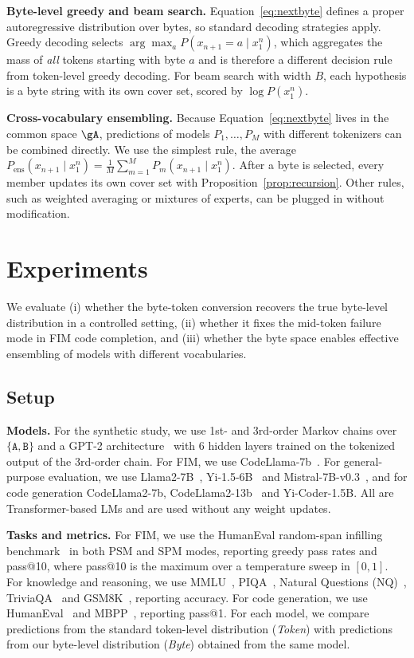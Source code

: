 \documentclass{article} %
\newcommand{\tok}[1]{\texttt{#1}}
\begin{document}
\textbf{Byte-level greedy and beam search.} Equation~\ref{eq:nextbyte} defines a proper autoregressive distribution over bytes, so standard decoding strategies apply. Greedy decoding selects $\arg\max_a P(x_{n+1}{=}a\mid x_1^n)$, which aggregates the mass of \emph{all} tokens starting with byte $a$ and is therefore a different decision rule from token-level greedy decoding. For beam search with width $B$, each hypothesis is a byte string with its own cover set, scored by $\log P(x_1^n)$.

\textbf{Cross-vocabulary ensembling.} Because Equation~\ref{eq:nextbyte} lives in the common space $\gA$, predictions of models $P_1,\dots,P_M$ with different tokenizers can be combined directly. We use the simplest rule, the average $P_{\text{ens}}(x_{n+1}\mid x_1^n)=\frac{1}{M}\sum_{m=1}^M P_m(x_{n+1}\mid x_1^n)$. After a byte is selected, every member updates its own cover set with Proposition~\ref{prop:recursion}. Other rules, such as weighted averaging or mixtures of experts, can be plugged in without modification.

\section{Experiments}
\label{sec:experiments}
We evaluate (i) whether the byte-token conversion recovers the true byte-level distribution in a controlled setting, (ii) whether it fixes the mid-token failure mode in FIM code completion, and (iii) whether the byte space enables effective ensembling of models with different vocabularies.

\subsection{Setup}
\label{sec:exp_setup}
\textbf{Models.} For the synthetic study, we use 1st- and 3rd-order Markov chains over $\{\tok{A},\tok{B}\}$ and a GPT-2 architecture~\citep{radford2019gpt2} with 6 hidden layers trained on the tokenized output of the 3rd-order chain. For FIM, we use CodeLlama-7b~\citep{roziere2023codellama}. For general-purpose evaluation, we use Llama2-7B~\citep{touvron2023llama2}, Yi-1.5-6B~\citep{young2024yi} and Mistral-7B-v0.3~\citep{jiang2023mistral}, and for code generation CodeLlama2-7b, CodeLlama2-13b~\citep{roziere2023codellama} and Yi-Coder-1.5B. All are Transformer-based LMs and are used without any weight updates.

\textbf{Tasks and metrics.} For FIM, we use the HumanEval random-span infilling benchmark~\citep{bavarian2022fim} in both PSM and SPM modes, reporting greedy pass rates and pass@10, where pass@10 is the maximum over a temperature sweep in $[0,1]$. For knowledge and reasoning, we use MMLU~\citep{hendrycks2021mmlu}, PIQA~\citep{bisk2020piqa}, Natural Questions (NQ)~\citep{kwiatkowski2019nq}, TriviaQA~\citep{joshi2017triviaqa} and GSM8K~\citep{cobbe2021gsm8k}, reporting accuracy. For code generation, we use HumanEval~\citep{chen2021humaneval} and MBPP~\citep{austin2021mbpp}, reporting pass@1. For each model, we compare predictions from the standard token-level distribution (\emph{Token}) with predictions from our byte-level distribution (\emph{Byte}) obtained from the same model.
\end{document}
